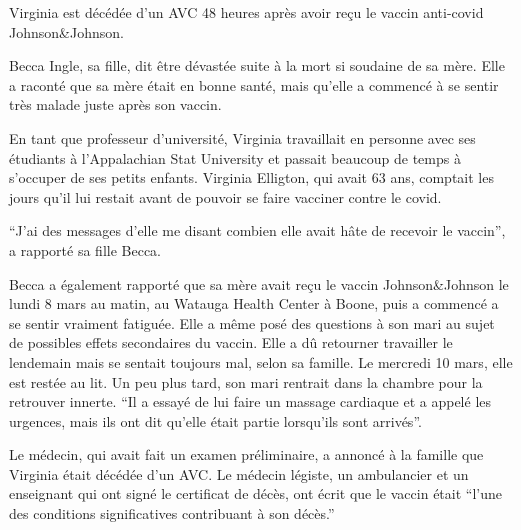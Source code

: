 Virginia est décédée d'un AVC 48 heures après avoir reçu le vaccin anti-covid
Johnson\&Johnson.

Becca Ingle, sa fille, dit être dévastée suite à la mort si soudaine de sa
mère. Elle a raconté que sa mère était en bonne santé, mais qu'elle a commencé à
se sentir très malade juste après son vaccin.

En tant que professeur d'université, Virginia travaillait en personne avec ses
étudiants à l'Appalachian Stat University et passait beaucoup de temps à
s'occuper de ses petits enfants. Virginia Elligton, qui avait 63 ans, comptait
les jours qu'il lui restait avant de pouvoir se faire vacciner contre le covid.

“J'ai des messages d'elle me disant combien elle avait hâte de recevoir le
vaccin”, a rapporté sa fille Becca.

Becca a également rapporté que sa mère avait reçu le vaccin Johnson\&Johnson le
lundi 8 mars au matin, au Watauga Health Center à Boone, puis a commencé a se
sentir vraiment fatiguée. Elle a même posé des questions à son mari au sujet de
possibles effets secondaires du vaccin. Elle a dû retourner travailler le
lendemain mais se sentait toujours mal, selon sa famille. Le mercredi 10 mars,
elle est restée au lit. Un peu plus tard, son mari rentrait dans la chambre pour
la retrouver innerte. “Il a essayé de lui faire un massage cardiaque et a appelé
les urgences, mais ils ont dit qu'elle était partie lorsqu'ils sont arrivés”.

Le médecin, qui avait fait un examen préliminaire, a annoncé à la famille que
Virginia était décédée d'un AVC. Le médecin légiste, un ambulancier et un
enseignant qui ont signé le certificat de décès, ont écrit que le vaccin était
“l'une des conditions significatives contribuant à son décès.”

